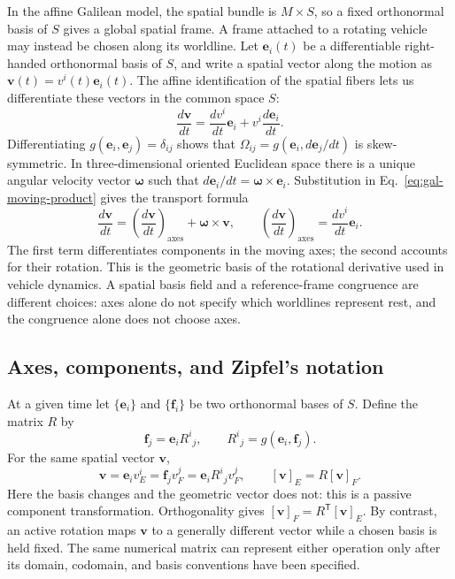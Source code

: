 In the affine Galilean model, the spatial bundle is $M\times S$, so a fixed
orthonormal basis of $S$ gives a global spatial frame.  A frame attached to a
rotating vehicle may instead be chosen along its worldline.  Let
$\mathbf e_i(t)$ be a differentiable right-handed orthonormal basis of $S$,
and write a spatial vector along the motion as
$\mathbf v(t)=v^i(t)\mathbf e_i(t)$.  The affine identification of the
spatial fibers lets us differentiate these vectors in the common space $S$:
\begin{equation}\label{eq:gal-moving-product}
 \frac{d\mathbf v}{dt}
 =\frac{dv^i}{dt}\mathbf e_i
 +v^i\frac{d\mathbf e_i}{dt}.
\end{equation}
Differentiating $g(\mathbf e_i,\mathbf e_j)=\delta_{ij}$ shows that
$\Omega_{ij}=g(\mathbf e_i,d\mathbf e_j/dt)$ is skew-symmetric.  In
three-dimensional oriented Euclidean space there is a unique angular
velocity vector $\boldsymbol\omega$ such that
$d\mathbf e_i/dt=\boldsymbol\omega\times\mathbf e_i$.  Substitution in
Eq.~\eqref{eq:gal-moving-product} gives the transport formula
\begin{equation}\label{eq:gal-moving-transport}
 \frac{d\mathbf v}{dt}
 =\left(\frac{d\mathbf v}{dt}\right)_{\!\mathrm{axes}}
 +\boldsymbol\omega\times\mathbf v,\qquad
 \left(\frac{d\mathbf v}{dt}\right)_{\!\mathrm{axes}}
 =\frac{dv^i}{dt}\mathbf e_i.
\end{equation}
The first term differentiates components in the moving axes; the second
accounts for their rotation.  This is the geometric basis of the rotational
derivative used in vehicle dynamics.  A spatial basis field and a
reference-frame congruence are different choices: axes alone do not specify
which worldlines represent rest, and the congruence alone does not choose
axes.

\subsection{Axes, components, and Zipfel's notation}

At a given time let $\{\mathbf e_i\}$ and $\{\mathbf f_i\}$ be two
orthonormal bases of $S$.  Define the matrix $R$ by
\begin{equation}\label{eq:gal-basis-map}
 \mathbf f_j=\mathbf e_i R^i{}_{j},\qquad R^i{}_{j}=g(\mathbf e_i,\mathbf f_j).
\end{equation}
For the same spatial vector $\mathbf v$,
\begin{equation}\label{eq:gal-passive}
 \mathbf v=\mathbf e_i v_E^i=\mathbf f_j v_F^j
 =\mathbf e_i R^i{}_{j}v_F^j,
 \qquad [\mathbf v]_E=R[\mathbf v]_F.
\end{equation}
Here the basis changes and the geometric vector does not: this is a passive
component transformation.  Orthogonality gives
$[\mathbf v]_F=R^{\mathsf T}[\mathbf v]_E$.  By contrast, an active rotation
maps $\mathbf v$ to a generally different vector while a chosen basis is held
fixed.  The same numerical matrix can represent either operation only after
its domain, codomain, and basis conventions have been specified.

